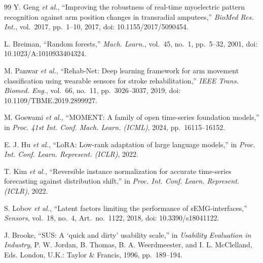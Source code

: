 \documentclass[10pt,a4paper,twocolumn]{article}
\begin{document}
\begin{thebibliography}{99}
 Y. Geng \textit{et al.}, ``Improving the robustness of real-time myoelectric pattern recognition against arm position changes in transradial amputees,'' \textit{BioMed Res. Int.}, vol.~2017, pp.~1--10, 2017, doi: 10.1155/2017/5090454.

 L. Breiman, ``Random forests,'' \textit{Mach. Learn.}, vol.~45, no.~1, pp.~5--32, 2001, doi: 10.1023/A:1010933404324.

 M. Panwar \textit{et al.}, ``Rehab-Net: Deep learning framework for arm movement classification using wearable sensors for stroke rehabilitation,'' \textit{IEEE Trans. Biomed. Eng.}, vol.~66, no.~11, pp.~3026--3037, 2019, doi: 10.1109/TBME.2019.2899927.

 M. Goswami \textit{et al.}, ``MOMENT: A family of open time-series foundation models,'' in \textit{Proc. 41st Int. Conf. Mach. Learn. (ICML)}, 2024, pp.~16115--16152.

 E. J. Hu \textit{et al.}, ``LoRA: Low-rank adaptation of large language models,'' in \textit{Proc. Int. Conf. Learn. Represent. (ICLR)}, 2022.

 T. Kim \textit{et al.}, ``Reversible instance normalization for accurate time-series forecasting against distribution shift,'' in \textit{Proc. Int. Conf. Learn. Represent. (ICLR)}, 2022.

 S. Lobov \textit{et al.}, ``Latent factors limiting the performance of sEMG-interfaces,'' \textit{Sensors}, vol.~18, no.~4, Art.~no.~1122, 2018, doi: 10.3390/s18041122.

 J. Brooke, ``SUS: A `quick and dirty' usability scale,'' in \textit{Usability Evaluation in Industry}, P. W. Jordan, B. Thomas, B. A. Weerdmeester, and I. L. McClelland, Eds. London, U.K.: Taylor \& Francis, 1996, pp.~189--194.

\end{thebibliography}
\end{document}
